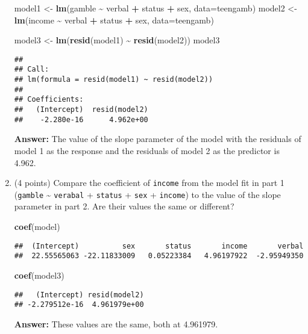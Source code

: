 \documentclass[
]{article}
\newenvironment{Shaded}{\begin{snugshade}}{\end{snugshade}}
\newcommand{\AttributeTok}[1]{\textcolor[rgb]{0.13,0.29,0.53}{#1}}
\newcommand{\FunctionTok}[1]{\textcolor[rgb]{0.13,0.29,0.53}{\textbf{#1}}}
\newcommand{\NormalTok}[1]{#1}
\newcommand{\OtherTok}[1]{\textcolor[rgb]{0.56,0.35,0.01}{#1}}
\newcommand{\SpecialCharTok}[1]{\textcolor[rgb]{0.81,0.36,0.00}{\textbf{#1}}}
\begin{document}
\begin{enumerate}
\begin{Shaded}
\begin{Highlighting}[]
\NormalTok{model1 }\OtherTok{\textless{}{-}} \FunctionTok{lm}\NormalTok{(gamble }\SpecialCharTok{\textasciitilde{}}\NormalTok{ verbal }\SpecialCharTok{+}\NormalTok{ status }\SpecialCharTok{+}\NormalTok{ sex, }\AttributeTok{data=}\NormalTok{teengamb)}
\NormalTok{model2 }\OtherTok{\textless{}{-}} \FunctionTok{lm}\NormalTok{(income }\SpecialCharTok{\textasciitilde{}}\NormalTok{ verbal }\SpecialCharTok{+}\NormalTok{ status }\SpecialCharTok{+}\NormalTok{ sex, }\AttributeTok{data=}\NormalTok{teengamb)}

\NormalTok{model3 }\OtherTok{\textless{}{-}} \FunctionTok{lm}\NormalTok{(}\FunctionTok{resid}\NormalTok{(model1) }\SpecialCharTok{\textasciitilde{}} \FunctionTok{resid}\NormalTok{(model2))}
\NormalTok{model3}
\end{Highlighting}
\end{Shaded}

\begin{verbatim}
## 
## Call:
## lm(formula = resid(model1) ~ resid(model2))
## 
## Coefficients:
##   (Intercept)  resid(model2)  
##    -2.280e-16      4.962e+00
\end{verbatim}

  \textbf{Answer:} The value of the slope parameter of the model with
  the residuals of model 1 as the response and the residuals of model 2
  as the predictor is 4.962.
\item
  (4 points) Compare the coefficient of \texttt{income} from the model
  fit in part 1 (\texttt{gamble} \textasciitilde{} \texttt{verabal} +
  \texttt{status} + \texttt{sex} + \texttt{income}) to the value of the
  slope parameter in part 2. Are their values the same or different?

\begin{Shaded}
\begin{Highlighting}[]
\FunctionTok{coef}\NormalTok{(model)}
\end{Highlighting}
\end{Shaded}

\begin{verbatim}
##  (Intercept)          sex       status       income       verbal 
##  22.55565063 -22.11833009   0.05223384   4.96197922  -2.95949350
\end{verbatim}

\begin{Shaded}
\begin{Highlighting}[]
\FunctionTok{coef}\NormalTok{(model3)}
\end{Highlighting}
\end{Shaded}

\begin{verbatim}
##   (Intercept) resid(model2) 
## -2.279512e-16  4.961979e+00
\end{verbatim}

  \textbf{Answer:} These values are the same, both at 4.961979.
\end{enumerate}
\end{document}
